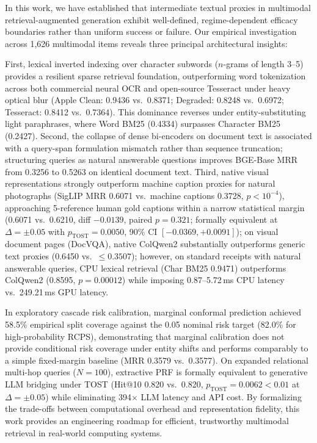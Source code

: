 In this work, we have established that intermediate textual proxies in multimodal retrieval-augmented generation exhibit well-defined, regime-dependent efficacy boundaries rather than uniform success or failure. Our empirical investigation across 1,626 multimodal items reveals three principal architectural insights:

First, lexical inverted indexing over character subwords ($n$-grams of length 3--5) provides a resilient sparse retrieval foundation, outperforming word tokenization across both commercial neural OCR and open-source Tesseract under heavy optical blur (Apple Clean: 0.9436 vs.\ 0.8371; Degraded: 0.8248 vs.\ 0.6972; Tesseract: 0.8412 vs.\ 0.7364). This dominance reverses under entity-substituting light paraphrases, where Word BM25 (0.4334) surpasses Character BM25 (0.2427). Second, the collapse of dense bi-encoders on document text is associated with a query-span formulation mismatch rather than sequence truncation; structuring queries as natural answerable questions improves BGE-Base MRR from 0.3256 to 0.5263 on identical document text. Third, native visual representations strongly outperform machine caption proxies for natural photographs (SigLIP MRR 0.6071 vs.\ machine captions 0.3728, $p < 10^{-4}$), approaching 5-reference human gold captions within a narrow statistical margin (0.6071 vs.\ 0.6210, diff $-0.0139$, paired $p=0.321$; formally equivalent at $\Delta=\pm 0.05$ with $p_{\text{TOST}}=0.0050$, 90\% CI $[-0.0369, +0.0091]$); on visual document pages (DocVQA), native ColQwen2 substantially outperforms generic text proxies (0.6450 vs.\ $\le 0.3507$); however, on standard receipts with natural answerable queries, CPU lexical retrieval (Char BM25 0.9471) outperforms ColQwen2 (0.8595, $p = 0.00012$) while imposing 0.87--5.72\,ms CPU latency vs.\ 249.21\,ms GPU latency.

In exploratory cascade risk calibration, marginal conformal prediction achieved 58.5\% empirical split coverage against the 0.05 nominal risk target (82.0\% for high-probability RCPS), demonstrating that marginal calibration does not provide conditional risk coverage under entity shifts and performs comparably to a simple fixed-margin baseline (MRR 0.3579 vs.\ 0.3577). On expanded relational multi-hop queries ($N=100$), extractive PRF is formally equivalent to generative LLM bridging under TOST (Hit@10 0.820 vs.\ 0.820, $p_{\text{TOST}}=0.0062 < 0.01$ at $\Delta=\pm 0.05$) while eliminating 394$\times$ LLM latency and API cost. By formalizing the trade-offs between computational overhead and representation fidelity, this work provides an engineering roadmap for efficient, trustworthy multimodal retrieval in real-world computing systems.

